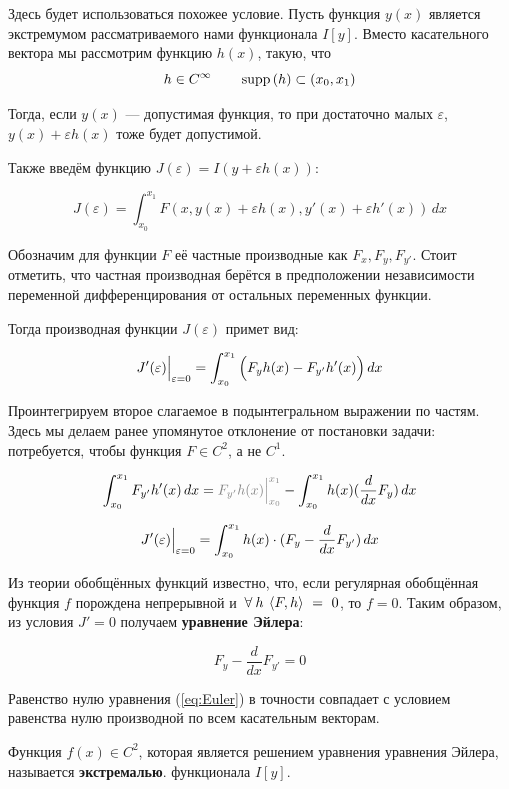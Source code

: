 \documentclass[12pt]{article}
\begin{document}
			Здесь будет использоваться похожее условие. Пусть функция $y(x)$ является экстремумом 
			рассматриваемого нами функционала $I[y]$. Вместо касательного вектора мы рассмотрим
			функцию $h(x)$, такую, что
			$$h \in C^{\infty} \qquad \,\text{supp}\,(h) \subset (x_0, x_1)$$
	
			Тогда, если $y(x)$ --- допустимая функция, то при достаточно малых $\varepsilon$,
			$y(x) + \varepsilon h(x)$ тоже будет допустимой.
			
			Также введём функцию $J(\varepsilon) = I(y + \varepsilon h(x))$:

			$$J(\varepsilon) = \int_{x_0}^{x_1} F(x, y(x) + \varepsilon h(x), y'(x) + \varepsilon h'(x))\,dx$$

			Обозначим для функции $F$ её частные производные как $F_x, F_y, F_{y'}$. Стоит отметить, что
			частная производная берётся в предположении независимости переменной дифференцирования от
			остальных переменных функции.

			Тогда производная функции $J(\varepsilon)$ примет вид:
	
			$$J'(\varepsilon)\Big|_{\varepsilon = 0}^{} = \int_{x_0}^{x_1} \Big( F_{y}h(x) - F_{y'}h'(x) \Big)\,dx$$
	
			Проинтегрируем второе слагаемое в подынтегральном выражении по частям. Здесь мы делаем ранее
			упомянутое отклонение от постановки задачи: потребуется, чтобы функция $F \in C^2$, а не $C^1$.

			$$\int_{x_0}^{x_1} F_{y'}h'(x) \,dx = \off{F_{y'}h(x) \lims{x_0}{x_1}} - \int_{x_0}^{x_1} h(x)(\frac{d}{dx} F_y)\,dx$$

			$$J'(\varepsilon)\Big|_{\varepsilon = 0}^{} = \int_{x_0}^{x_1}h(x)\cdot(F_y - \frac{d}{dx}F_{y'}) \,dx$$


			Из теории обобщённых функций известно, что, если регулярная обобщённая функция $f$ порождена
			непрерывной и $\forall h\:\scal{F}{h}~=~0$, то $f = 0$. Таким образом, из условия $J' = 0$
			получаем \textbf{уравнение Эйлера}:

			\begin{equation} \label{eq:Euler}
				F_y - \frac{d}{dx}F_{y'} = 0 
			\end{equation}
	
			Равенство нулю уравнения (\ref{eq:Euler}) в точности совпадает с условием равенства нулю
			производной по всем касательным векторам.
	
			\begin{defi}
				Функция $f(x) \in C^2$, которая является решением уравнения уравнения Эйлера, называется
				\textbf{экстремалью}.
				функционала $I[y]$.
			\end{defi}
			
\end{document}
